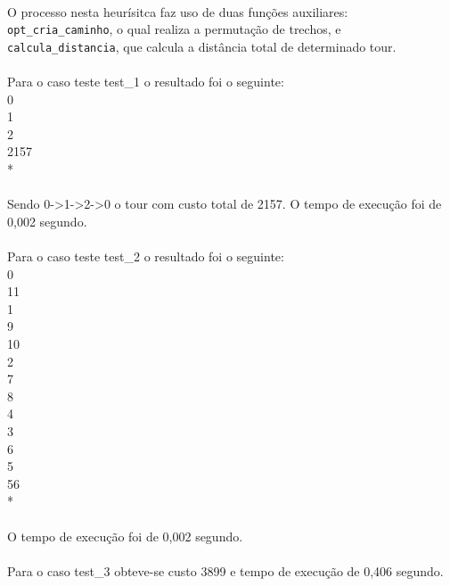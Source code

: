 \documentclass[12pt,a4paper]{article}
\begin{document}
  {\paragraph{} O processo nesta heurísitca faz uso de duas funções auxiliares: {\tt opt\_cria\_caminho}, o qual realiza a permutação de trechos, e {\tt calcula\_distancia}, que calcula a distância total de determinado tour. }
  {\paragraph{} Para o caso teste test\_1 o resultado foi o seguinte:\\ 0 \\ 1 \\ 2 \\ 2157 \\ {*}}
  {\paragraph{} Sendo 0->1->2->0 o tour com custo total de 2157. O tempo de execução foi de 0,002 segundo.}
  {\paragraph{} Para o caso teste test\_2 o resultado foi o seguinte:\\ 0 \\ 11 \\ 1 \\ 9 \\ 10 \\ 2 \\ 7 \\ 8 \\ 4 \\ 3 \\ 6 \\ 5 \\ 56 \\ {*}}
  {\paragraph{} O tempo de execução foi de 0,002 segundo.}
  {\paragraph{} Para o caso test\_3 obteve-se custo 3899 e tempo de execução de 0,406 segundo.}
  
 \newpage
\end{document}
